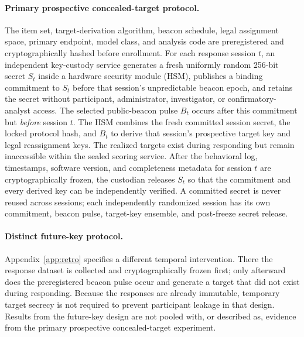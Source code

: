 \documentclass[11pt,letterpaper]{article}
\begin{document}
\paragraph{Primary prospective concealed-target protocol.}
The item set, target-derivation algorithm, beacon schedule, legal assignment space, primary endpoint, model class, and analysis code are preregistered and cryptographically hashed before enrollment. For each response session $t$, an independent key-custody service generates a fresh uniformly random 256-bit secret $S_t$ inside a hardware security module (HSM), publishes a binding commitment to $S_t$ before that session's unpredictable beacon epoch, and retains the secret without participant, administrator, investigator, or confirmatory-analyst access. The selected public-beacon pulse $B_t$ occurs after this commitment but \emph{before} session $t$. The HSM combines the fresh committed session secret, the locked protocol hash, and $B_t$ to derive that session's prospective target key and legal reassignment keys. The realized targets exist during responding but remain inaccessible within the sealed scoring service. After the behavioral log, timestamps, software version, and completeness metadata for session $t$ are cryptographically frozen, the custodian releases $S_t$ so that the commitment and every derived key can be independently verified. A committed secret is never reused across sessions; each independently randomized session has its own commitment, beacon pulse, target-key ensemble, and post-freeze secret release.

\paragraph{Distinct future-key protocol.}
Appendix~\ref{app:retro} specifies a different temporal intervention. There the response dataset is collected and cryptographically frozen first; only afterward does the preregistered beacon pulse occur and generate a target that did not exist during responding. Because the responses are already immutable, temporary target secrecy is not required to prevent participant leakage in that design. Results from the future-key design are not pooled with, or described as, evidence from the primary prospective concealed-target experiment.
\end{document}
